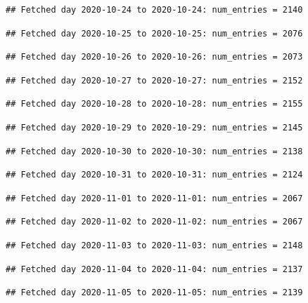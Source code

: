 \documentclass[]{article}
\begin{document}
\begin{verbatim}
## Fetched day 2020-10-24 to 2020-10-24: num_entries = 2140
\end{verbatim}

\begin{verbatim}
## Fetched day 2020-10-25 to 2020-10-25: num_entries = 2076
\end{verbatim}

\begin{verbatim}
## Fetched day 2020-10-26 to 2020-10-26: num_entries = 2073
\end{verbatim}

\begin{verbatim}
## Fetched day 2020-10-27 to 2020-10-27: num_entries = 2152
\end{verbatim}

\begin{verbatim}
## Fetched day 2020-10-28 to 2020-10-28: num_entries = 2155
\end{verbatim}

\begin{verbatim}
## Fetched day 2020-10-29 to 2020-10-29: num_entries = 2145
\end{verbatim}

\begin{verbatim}
## Fetched day 2020-10-30 to 2020-10-30: num_entries = 2138
\end{verbatim}

\begin{verbatim}
## Fetched day 2020-10-31 to 2020-10-31: num_entries = 2124
\end{verbatim}

\begin{verbatim}
## Fetched day 2020-11-01 to 2020-11-01: num_entries = 2067
\end{verbatim}

\begin{verbatim}
## Fetched day 2020-11-02 to 2020-11-02: num_entries = 2067
\end{verbatim}

\begin{verbatim}
## Fetched day 2020-11-03 to 2020-11-03: num_entries = 2148
\end{verbatim}

\begin{verbatim}
## Fetched day 2020-11-04 to 2020-11-04: num_entries = 2137
\end{verbatim}

\begin{verbatim}
## Fetched day 2020-11-05 to 2020-11-05: num_entries = 2139
\end{verbatim}
\end{document}
